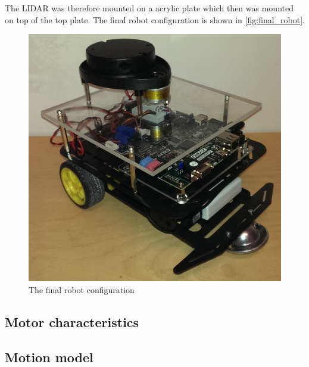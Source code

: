 \documentclass[Main]{subfiles}
\begin{document}
The LIDAR was therefore mounted on a acrylic plate which then was mounted on top of the top plate. 
The final robot configuration is shown in \autoref{fig:final_robot}.
\begin{figure}[H]
	\centering
	\includegraphics[scale=0.3]{./Figures/final_robot.png}
	\caption{The final robot configuration}
	\label{fig:final_robot}
\end{figure}\noindent

	\subsection{Motor characteristics} %
		\label{sub:motor_characteristics}
		

	\subsection{Motion model} %
		\label{sub:motion_model}
		

\end{document}
